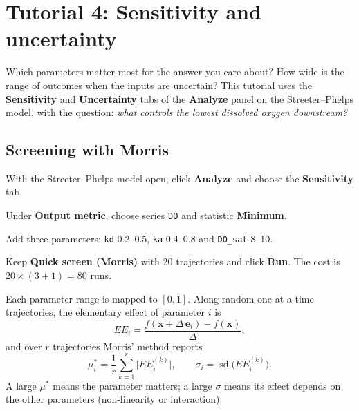 \documentclass[11pt,oneside]{book}
\newcommand{\ui}[1]{\textsf{\textbf{#1}}}                       %
\newcommand{\el}[1]{\texttt{#1}}                                %
\begin{document}
\chapter{Tutorial 4: Sensitivity and uncertainty}\label{ch:t4}

Which parameters matter most for the answer you care about? How wide is the
range of outcomes when the inputs are uncertain? This tutorial uses the
\ui{Sensitivity} and \ui{Uncertainty} tabs of the \ui{Analyze} panel on the
Streeter--Phelps model, with the question: \emph{what controls the lowest
dissolved oxygen downstream?}

\section{Screening with Morris}

\begin{tryit}
\begin{steps}
  \item With the Streeter--Phelps model open, click \ui{Analyze} and choose
  the \ui{Sensitivity} tab.
  \item Under \ui{Output metric}, choose series \el{DO} and statistic
  \ui{Minimum}.
  \item Add three parameters: \el{kd} 0.2--0.5, \el{ka} 0.4--0.8 and
  \el{DO\_sat} 8--10.
  \item Keep \ui{Quick screen (Morris)} with 20 trajectories and click
  \ui{Run}. The cost is $20 \times (3 + 1) = 80$ runs.
\end{steps}
\end{tryit}

\begin{mathbox}
Each parameter range is mapped to $[0,1]$. Along random one-at-a-time
trajectories, the elementary effect of parameter $i$ is
\begin{equation}
  EE_i = \frac{f(\mathbf x + \Delta\,\mathbf e_i) - f(\mathbf x)}{\Delta},
\end{equation}
and over $r$ trajectories Morris' method \cite{morris1991} reports
\begin{equation}
  \mu_i^{*} = \frac{1}{r}\sum_{k=1}^{r} \bigl|EE_i^{(k)}\bigr| ,
  \qquad
  \sigma_i = \operatorname{sd}\bigl(EE_i^{(k)}\bigr).
\end{equation}
A large $\mu^{*}$ means the parameter matters; a large $\sigma$ means its
effect depends on the other parameters (non-linearity or interaction).
\end{mathbox}
\end{document}
